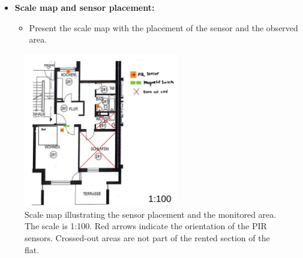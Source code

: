 \documentclass[A4,10pt]{article}
\begin{document}
\begin{itemize}
	\item \textbf{Scale map and sensor placement:}
	\begin{itemize}
		\item Present the scale map with the placement of the sensor and the observed area.
	\end{itemize}
\end{itemize}

\begin{figure}[H]
\centering
\includegraphics[width=0.6\textwidth]{grundriss.jpeg}
\caption{Scale map illustrating the sensor placement and the monitored area. The scale is 1:100. Red arrows indicate the orientation of the PIR sensors. Crossed-out areas are not part of the rented section of the flat.}
\label{fig:scale_map}
\end{figure}
\end{document}
